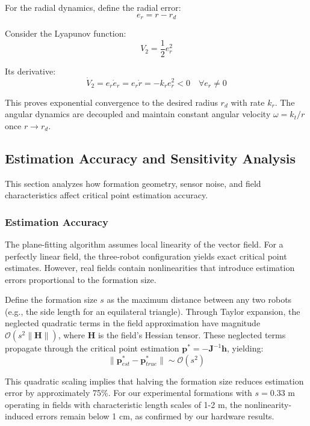 \documentclass[lettersize,journal]{IEEEtran}
\begin{document}
For the radial dynamics, define the radial error:
\begin{equation}
e_r = r - r_d
\end{equation}

Consider the Lyapunov function:
\begin{equation}
V_2 = \frac{1}{2}e_r^2
\end{equation}

Its derivative:
\begin{equation}
\dot{V}_2 = e_r\dot{e}_r = e_r\dot{r} = -k_r e_r^2 < 0 \quad \forall e_r \neq 0
\end{equation}

This proves exponential convergence to the desired radius $r_d$ with rate $k_r$. The angular dynamics are decoupled and maintain constant angular velocity $\omega = k_t/r$ once $r \to r_d$.



\subsection{Estimation Accuracy and Sensitivity Analysis}

This section analyzes how formation geometry, sensor noise, and field characteristics affect critical point estimation accuracy.

\subsubsection{Estimation Accuracy}

The plane-fitting algorithm assumes local linearity of the vector field. For a perfectly linear field, the three-robot configuration yields exact critical point estimates. However, real fields contain nonlinearities that introduce estimation errors proportional to the formation size.

Define the formation size $s$ as the maximum distance between any two robots (e.g., the side length for an equilateral triangle). Through Taylor expansion, the neglected quadratic terms in the field approximation have magnitude $\mathcal{O}(s^2\|\mathbf{H}\|)$, where $\mathbf{H}$ is the field's Hessian tensor. These neglected terms propagate through the critical point estimation $\mathbf{p}^* = -\mathbf{J}^{-1}\mathbf{h}$, yielding:
\begin{equation}
\|\mathbf{p}^*_{est} - \mathbf{p}^*_{true}\| \sim \mathcal{O}(s^2)
\end{equation}

This quadratic scaling implies that halving the formation size reduces estimation error by approximately 75\%. For our experimental formations with $s = 0.33$ m operating in fields with characteristic length scales of 1-2 m, the nonlinearity-induced errors remain below 1 cm, as confirmed by our hardware results.
\end{document}
